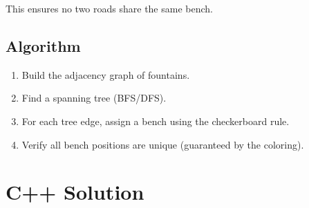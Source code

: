 \documentclass[11pt,a4paper]{article}
\begin{document}
This ensures no two roads share the same bench.

\subsection{Algorithm}
\begin{enumerate}
  \item Build the adjacency graph of fountains.
  \item Find a spanning tree (BFS/DFS).
  \item For each tree edge, assign a bench using the checkerboard rule.
  \item Verify all bench positions are unique (guaranteed by the coloring).
\end{enumerate}

\section{C++ Solution}
\end{document}
